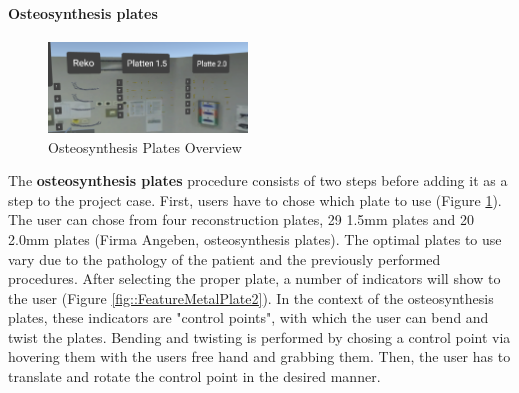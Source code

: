 \paragraph{Osteosynthesis plates}

\begin{figure}[ht]
    \centering
    \includegraphics[width=200px]{images/implementation/features/procedures/metal_plates_1.png}
    \caption{\label{fig::FeatureMetalPlate} Osteosynthesis Plates Overview}
\end{figure}

The \textbf{osteosynthesis plates} procedure consists of two steps before adding it as a step to the project case.
First, users have to chose which plate to use (Figure \ref{fig::FeatureMetalPlate}).
The user can chose from four reconstruction plates, 29 1.5mm plates and 20 2.0mm plates (Firma Angeben, osteosynthesis plates).
The optimal plates to use vary due to the pathology of the patient and the previously performed procedures.
After selecting the proper plate, a number of indicators will show to the user (Figure \ref{fig::FeatureMetalPlate2}).
In the context of the osteosynthesis plates, these indicators are "control points", with which the user can bend and twist the plates.
Bending and twisting is performed by chosing a control point via hovering them with the users free hand and grabbing them.
Then, the user has to translate and rotate the control point in the desired manner.
